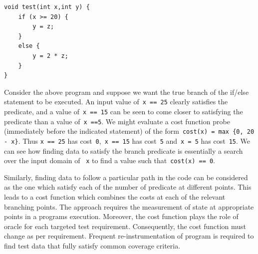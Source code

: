 \begin{lstlisting}
void test(int x,int y) {
	if (x >= 20) {
		y = z; 
	}
	else {
		y = 2 * z;
	}
}
\end{lstlisting}

Consider the above program and suppose we want the true branch of the if/else statement to be executed. An input value of~\verb+x == 25+ clearly satisfies the predicate, and a value of~\verb+x == 15+ can be seen to come closer to satisfying the predicate than a value of~\verb+x ==5+. We might evaluate a cost function probe (immediately before the indicated statement) of the form~\verb+cost(x) = max {0, 20 - x}+. Thus \verb+x == 25+ has cost~\verb+0+,~\verb+x == 15+ has cost~\verb+5+ and~\verb+x = 5+ has cost~\verb+15+. We can see how finding data to satisfy the branch predicate is essentially a search over the input domain of ~\verb+x+ to find a value such that~\verb+cost(x) == 0+. 

Similarly, finding data to follow a particular path in the code can be considered as the one which satisfy each of the number of predicate at different points. This leads to a cost function which combines the costs at each of the relevant branching points. The approach requires the measurement of state at appropriate points in a programs execution. Moreover, the cost function plays the role of oracle for each targeted test requirement. Consequently, the cost function must change as per requirement. Frequent re-instrumentation of program is required to find test data that fully satisfy common coverage criteria. 







